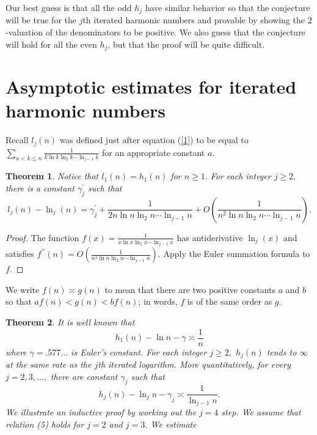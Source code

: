 \documentclass{article}
\theoremstyle{theorem}
\newtheorem{theorem}{Theorem}
\theoremstyle{definition}
\begin{document}
Our best guess is that all the odd $h_{j}$ have similar behavior so that
the conjecture will be true for the $j$th iterated harmonic numbers and
provable by showing the $2$-valuation of the denominators to be positive. We
also guess that the conjecture will hold for all the even $h_{j}$, but that
the proof will be quite difficult.

\section{Asymptotic estimates for iterated harmonic numbers}

Recall $l_{j}\left( n\right) $ was defined just after equation (\ref{1}) to
be equal to {\small $\sum_{a<k\leq n}\frac{1}{k\ln k\ln _{2}k\cdots \ln _{j-1}k}$}
for an appropriate constant $a$.

\begin{theorem}
\label{Th1}Notice that $l_{1}\left( n\right) =h_{1}\left( n\right) $ for $%
n\geq 1.$ For each integer $j\geq 2,$ there is a constant $\gamma
_{j}^{\prime }$ such that%
{\small\begin{equation}
l_{j}(n)-\ln _{j}\left( n\right) =\gamma _{j}^{\prime }+\frac{1}{2n\ln n\ln
_{2}n\cdots \ln _{j-1}n}+O\left( \frac{1}{n^{2}\ln n\ln _{2}n\cdots \ln
_{j-1}n}\right) .
\end{equation}}
\end{theorem}

\begin{proof}
The function {\small $f\left( x\right) =\frac{1}{x\ln x\ln _{2}x\cdots \ln _{j-1}x}$}
has antiderivative $\ln _{j}\left( x\right) $ and satisfies {\small $f^{\prime
\prime }\left( n\right) =O\left( \frac{1}{n^{3}\ln n\ln _{2}n\cdots \ln
_{j-1}n}\right) $.} Apply the Euler summation formula to $f$.
\end{proof}

We write $f\left( n\right) \asymp g\left( n\right) $ to mean that there are
two positive constants $a$ and $b$ so that $af\left( n\right) <g\left(
n\right) <bf\left( n\right) $; in words, $f$ is of the same order as $g.$ 
\cite[page 7]{HW}

\begin{theorem}
\label{Th2}It is well known that 
\begin{equation}
h_{1}\left( n\right) -\ln n-\gamma \asymp \frac{1}{n}  \label{6}
\end{equation}%
where $\gamma =.577\dots $ is Euler's constant. For each integer $j\geq 2,$ $%
h_{j}\left( n\right) $ tends to $\infty $ at the same rate as the $j$th
iterated logarithm. More quantitatively, for every $j=2,3,\dots ,$ there are
constant $\gamma _{j}$ such that%
\begin{equation}
h_{j}\left( n\right) -\ln _{j}n-\gamma _{j}\asymp \frac{1}{\ln _{j-1}n}.
\label{5}
\end{equation}%
We illustrate an inductive proof by working out the $j=4$ step. We assume
that relation (5) holds for $j=2$ and $j=3$. We estimate
\end{theorem}
\end{document}
